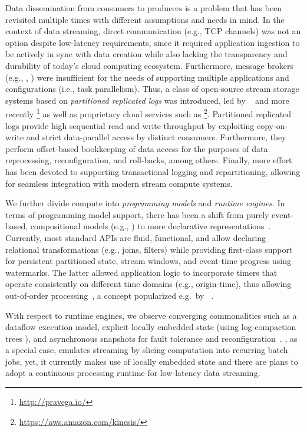  Data dissemination from consumers to producers is a problem that has been revisited multiple times with different assumptions and needs in mind. In the context of data streaming, direct communication (e.g., TCP channels) was not an option despite low-latency requirements, since it required application ingestion to be actively in sync with data creation while also lacking the transparency and durability of today's cloud computing ecosystem. Furthermore, message brokers (e.g., , ) were insufficient for the needs of supporting multiple applications and configurations (i.e., task parallelism). Thus, a class of open-source stream storage systems based on \emph{partitioned replicated logs} was introduced, led by ~\cite{kreps2011kafka} and more recently \footnote{\url{http://pravega.io/}} as well as proprietary cloud services such as \footnote{\url{https://aws.amazon.com/kinesis/}}. Partitioned replicated logs provide high sequential read and write throughput by exploiting copy-on-write and strict data-parallel access by distinct consumers. Furthermore, they perform offset-based bookkeeping of data access for the purposes of data reprocessing, reconfiguration, and roll-backs, among others. Finally, more effort has been devoted to supporting transactional logging and repartitioning, allowing for seamless integration with modern stream compute systems.

 We further divide compute into \emph{programming models} and \emph{runtime engines}. In terms of programming model support, there has been a shift from purely event-based, compositional models (e.g.,  \cite{toshniwal_et_al_2014}) to more declarative representations~\cite{akidau2015dataflow,carbone_et_al_2015,zaharia_et_al_2013}. Currently, most standard APIs are fluid, functional, and allow declaring relational transformations (e.g., joins, filters) while providing first-class support for persistent partitioned state, stream windows, and event-time prog\-ress using watermarks. The latter allowed application logic to incorporate timers that operate consistently on different time domains (e.g., origin-time), thus allowing out-of-order processing~\cite{li2008out}, a concept popularized e.g.\ by ~\cite{akidau2015dataflow}.

With respect to runtime engines, we observe converging commonalities
such as a dataflow execution model, explicit locally embedded state
(using log-compaction trees \cite{CUSTOM:web/rocksdb}), and
asynchronous snapshots for fault tolerance and
reconfiguration~\cite{state2017carbone,jacques2016consistent}.  \cite{zaharia_et_al_2013}, as a special case, emulates
streaming by slicing computation into recurring batch jobs, yet, it
currently makes use of locally embedded state and there are plans to
adopt a continuous processing runtime for low-latency data streaming.

